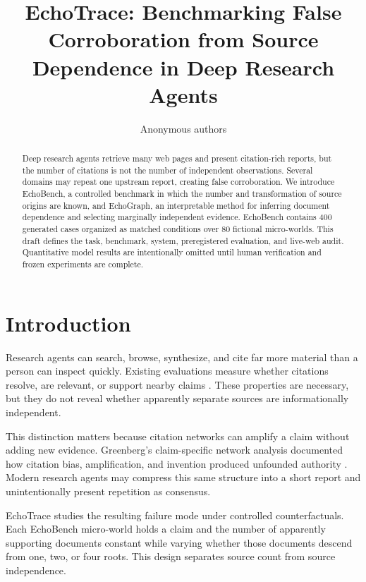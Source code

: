 \documentclass[11pt]{article}
\title{EchoTrace: Benchmarking False Corroboration from Source Dependence in Deep Research Agents}
\author{Anonymous authors}
\date{}
\begin{document}
\maketitle

\begin{center}
\end{center}

\begin{abstract}
Deep research agents retrieve many web pages and present citation-rich reports, but the number of
citations is not the number of independent observations. Several domains may repeat one upstream
report, creating false corroboration. We introduce EchoBench, a controlled benchmark in which the
number and transformation of source origins are known, and EchoGraph, an interpretable method for
inferring document dependence and selecting marginally independent evidence. EchoBench contains
400 generated cases organized as matched conditions over 80 fictional micro-worlds. This draft
defines the task, benchmark, system, preregistered evaluation, and live-web audit. Quantitative model
results are intentionally omitted until human verification and frozen experiments are complete.
\end{abstract}

\section{Introduction}
Research agents can search, browse, synthesize, and cite far more material than a person can inspect
quickly. Existing evaluations measure whether citations resolve, are relevant, or support nearby
claims \citep{gao2023alce,onweller2026cited}. These properties are necessary, but they do not reveal
whether apparently separate sources are informationally independent.

This distinction matters because citation networks can amplify a claim without adding new evidence.
Greenberg's claim-specific network analysis documented how citation bias, amplification, and
invention produced unfounded authority \citep{greenberg2009citation}. Modern research agents may
compress this same structure into a short report and unintentionally present repetition as consensus.

EchoTrace studies the resulting failure mode under controlled counterfactuals. Each EchoBench
micro-world holds a claim and the number of apparently supporting documents constant while varying
whether those documents descend from one, two, or four roots. This design separates source count
from source independence.
\end{document}
